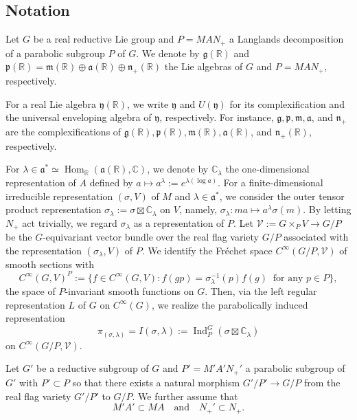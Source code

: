 \documentclass[a4paper,11pt,reqno]{amsart}
\newcommand{\fraka}{\mathfrak{a}}
\newcommand{\frakg}{\mathfrak{g}}
\newcommand{\frakm}{\mathfrak{m}}
\newcommand{\frakn}{\mathfrak{n}}
\newcommand{\frakp}{\mathfrak{p}}
\newcommand{\CC}{\mathbb{C}}
\newcommand{\0}{{\bf 0}}
\newcommand{\R}{\mathbb{R}}
\newcommand{\C}{\mathbb{C}}
\newcommand{\1}{{\bf 1}}
\DeclareMathOperator{\Ind}{Ind}
\DeclareMathOperator{\Hom}{Hom}
\newcommand{\fraky}{{\mathfrak y}}
\theoremstyle{plain}
\theoremstyle{definition}
\numberwithin{equation}{section}
\theoremstyle{definition}
\begin{document}
\subsection{Notation}\label{sec:prelim}

Let $G$ be a real reductive Lie group and $P=MAN_+ $ a Langlands decomposition of a parabolic subgroup $P$ of $G$. We denote by $\frakg(\R)$ and 
$\frakp(\R) = \frakm(\R) \oplus \fraka(\R) \oplus \frakn_+(\R)$ the Lie algebras of $G$ and 
$P=MAN_+$, respectively.

For a real Lie algebra $\mathfrak{y}(\R)$, we write $\mathfrak{y}$
and $U(\mathfrak{y})$ for its complexification and the universal enveloping algebra of 
$\fraky$, respectively. 
For instance, $\frakg, \frakp, \frakm, \fraka$, and $\frakn_+$ are the complexifications of $\frakg(\R), \frakp(\R), \frakm(\R), \fraka(\R)$, and $\frakn_+(\R)$, 
respectively.

For $\lambda \in \fraka^* \simeq \Hom_\R(\fraka(\R),\C)$,
we denote by $\C_\lambda$ 
the one-dimensional representation of $A$ defined by 
$a\mapsto a^\lambda:=e^{\lambda(\log a)}$. 
For a finite-dimensional irreducible 
representation $(\sigma, V)$ of $M$ and $\lambda \in \fraka^*$,
we consider  the outer tensor product representation 
$\sigma_\lambda:=\sigma \boxtimes \C_\lambda$
on $V$,
namely, 
$\sigma_\lambda \colon
ma \mapsto a^\lambda\sigma(m)$. By letting $N_+$ act trivially, we regard 
$\sigma_\lambda$ as a representation of $P$. Let $\mathcal{V}:=G \times_P V \to G/P$
be the $G$-equivariant vector bundle over the real flag variety $G/P$
 associated with the 
representation $(\sigma_\lambda, V)$ of $P$. We identify the Fr{\' e}chet space 
$C^\infty(G/P, \mathcal{V})$ of smooth sections with 
\begin{equation*}
C^\infty(G, V)^P:=\{f \in C^\infty(G,V) : 
f(gp) = \sigma_\lambda^{-1}(p)f(g)
\;\;
\text{for any $p \in P$}\},
\end{equation*}
the space of $P$-invariant smooth functions on $G$.
Then, via the left regular representation $L$ of $G$ on $C^\infty(G)$,
we realize the parabolically induced representation 
\begin{equation*}
\pi_{(\sigma, \lambda)} = I(\sigma,\lambda)
:=\Ind_{P}^G(\sigma\boxtimes \CC_\lambda)
\end{equation*}
on $C^\infty(G/P, \mathcal{V})$.

Let $G'$ be a reductive subgroup of $G$ and $P'=M'A'N_+'$ 
a parabolic subgroup of $G'$
with $P' \subset P$
so that there exists a natural morphism $G'/P' \to G/P$
from the real flag variety $G'/P'$ to $G/P$.
We further assume that 
\begin{equation}\label{eqn:MAN}
M'A' \subset MA \quad \text{and} \quad N_+' \subset N_+.
\end{equation}
\end{document}
